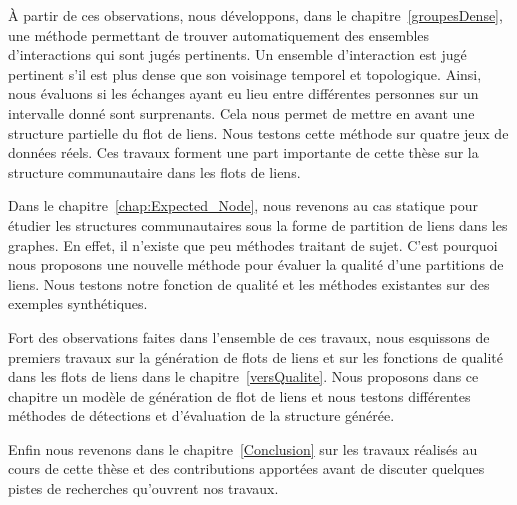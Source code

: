 \`A partir de ces observations, nous développons, dans le chapitre~\ref{groupesDense}, une méthode permettant de trouver automatiquement des ensembles d'interactions qui sont jugés pertinents.
Un ensemble d'interaction est jugé pertinent s’il est plus dense que son voisinage temporel et topologique.
Ainsi, nous évaluons si les échanges ayant eu lieu entre différentes personnes sur un intervalle donné sont surprenants.
Cela nous permet de mettre en avant une structure partielle du flot de liens.
Nous testons cette méthode sur quatre jeux de données réels.
Ces travaux forment une part importante de cette thèse sur la structure communautaire dans les flots de liens.

Dans le chapitre~\ref{chap:Expected_Node}, nous revenons au cas statique pour étudier les structures communautaires sous la forme de partition de liens dans les graphes.
En effet, il n'existe que peu méthodes traitant de sujet.
C'est pourquoi nous proposons une nouvelle méthode pour évaluer la qualité d'une partitions de liens.
Nous testons notre fonction de qualité et les méthodes existantes sur des exemples synthétiques.

Fort des observations faites dans l'ensemble de ces travaux, nous esquissons de premiers travaux sur la génération de flots de liens et sur les fonctions de qualité dans les flots de liens dans le chapitre~\ref{versQualite}.
Nous proposons dans ce chapitre un modèle de génération de flot de liens et nous testons différentes méthodes de détections et d'évaluation de la structure générée.


Enfin nous revenons dans le chapitre~\ref{Conclusion} sur les travaux réalisés au cours de cette thèse et des contributions apportées avant de discuter quelques pistes de recherches qu'ouvrent nos travaux.